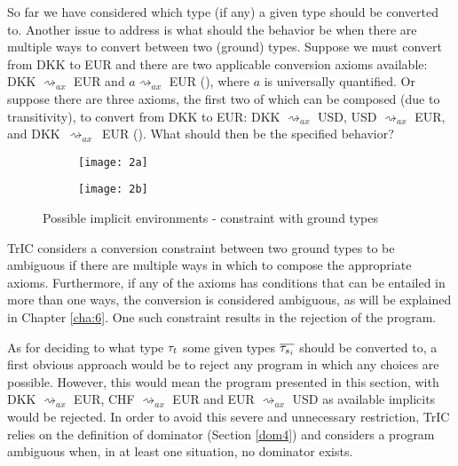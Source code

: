 So far we have considered which type (if any) a given type should be converted to. Another issue to address is what should the behavior be when there are multiple ways to convert between two (ground) types. Suppose we must convert from DKK to EUR and there are two applicable conversion axioms available: DKK $\rightsquigarrow_{ax}$ EUR and $a \rightsquigarrow_{ax}$ EUR (), where $a$ is universally quantified. Or suppose there are three axioms, the first two of which can be composed (due to transitivity), to convert from DKK to EUR: DKK $\rightsquigarrow_{ax}$ USD, USD $\rightsquigarrow_{ax}$ EUR, and DKK~$\rightsquigarrow_{ax}$~EUR (). What should then be the specified behavior?
\begin{figure}
  \centering
  \begin{subfigure}{.20\textwidth}
    \centering
    \texttt{[image: 2a]}
    \caption{}
    \label{2a}
  \end{subfigure}
  \begin{subfigure}{.20\textwidth}
    \centering
    \texttt{[image: 2b]}
    \caption{}
    \label{2b}
  \end{subfigure}
  \caption{Possible implicit environments - constraint with ground types}
\end{figure}

TrIC considers a conversion constraint between two ground types to be ambiguous if there are multiple ways in which to compose the appropriate axioms. Furthermore, if any of the axioms has conditions that can be entailed in more than one ways, the conversion is considered ambiguous, as will be explained in Chapter \ref{cha:6}. One such constraint results in the rejection of the program.

As for deciding to what type $\mathit{\tau}_t$ some given types $\overline{\mathit{\tau}_{s_i}}$ should be converted to, a first obvious approach would be to reject any program in which any choices are possible. However, this would mean the program presented in this section, with DKK $\rightsquigarrow_{ax}$ EUR, CHF $\rightsquigarrow_{ax}$ EUR and EUR $\rightsquigarrow_{ax}$ USD as available implicits would be rejected. In order to avoid this severe and unnecessary restriction, TrIC relies on the definition of dominator (Section \ref{dom4}) and considers a program ambiguous when, in at least one situation, no dominator exists.


